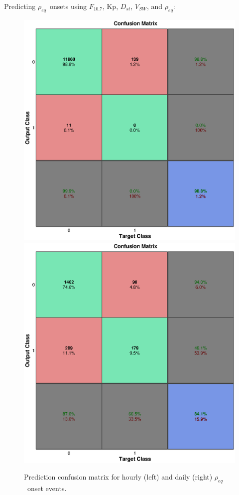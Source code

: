 \documentclass[xcolor={dvipsnames,table}]{beamer}
\newcommand{\req}{\ensuremath{\rho_{eq}}} %
\newcommand{\dst}{\ensuremath{D_{st}}} %
\newcommand{\f}{\ensuremath{F_{10.7}}} %
\begin{document}
\begin{frame}
	Predicting \req\ onsets using \f, Kp, \dst, $V_{SW}$, and \req:
	\begin{figure}[htp!]
		\centering
		\includegraphics[width=0.45\linewidth]{Figures/CH5/NNBinaryOnset-full-hourly-withreq.eps}
		\includegraphics[width=0.45\linewidth]{Figures/CH5/NNBinaryOnset-full-daily-withreq.eps}
		\caption{Prediction confusion matrix for hourly (left) and daily (right) \req\ onset events.}
		\label{fig:OnsetFullWithreq}
	\end{figure}
\end{frame}
\end{document}
